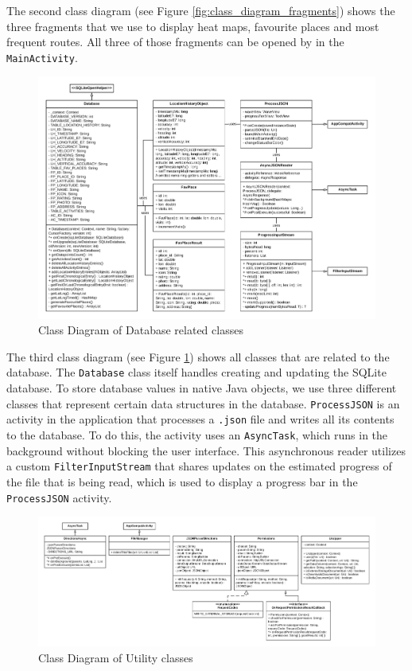 \documentclass[12p]{article}
\begin{document}
    The second class diagram (see Figure \ref{fig:class_diagram_fragments}) shows the three fragments that we use to display heat maps, favourite places and most frequent routes. All three of those fragments can be opened by in the \texttt{MainActivity}.
    
    \begin{figure}[H]
        \center
        \includegraphics[width=1.0\textwidth]{class_diagram/class_diagram_3}
	    \caption{Class Diagram of Database related classes}
	    \label{fig:class_diagram_database}
    \end{figure}
    
    The third class diagram (see Figure \ref{fig:class_diagram_database}) shows all classes that are related to the database. The \texttt{Database} class itself handles creating and updating the SQLite database. To store database values in native Java objects, we use three different classes that represent certain data structures in the database. \texttt{ProcessJSON} is an activity in the application that processes a \texttt{.json} file and writes all its contents to the database. To do this, the activity uses an \texttt{AsyncTask}, which runs in the background without blocking the user interface. This asynchronous reader utilizes a custom \texttt{FilterInputStream} that shares updates on the estimated progress of the file that is being read, which is used to display a progress bar in the \texttt{ProcessJSON} activity.
    
    \begin{figure}[H]
        \center
        \includegraphics[width=1.0\textwidth]{class_diagram/class_diagram_4}
	    \caption{Class Diagram of Utility classes}
	    \label{fig:class_diagram_utilities}
    \end{figure}
    
\end{document}
